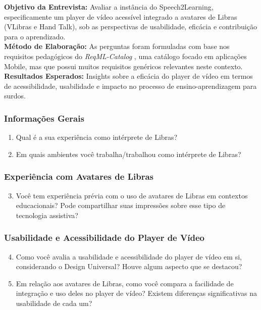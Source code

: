\noindent
\textbf{Objetivo da Entrevista:} Avaliar a instância do Speech2Learning, especificamente um player de vídeo acessível integrado a avatares de Libras (VLibras e Hand Talk), sob as perspectivas de usabilidade, eficácia e contribuição para o aprendizado.\\

\noindent
\textbf{Método de Elaboração:} As perguntas foram formuladas com base nos requisitos pedagógicos do \textit{ReqML-Catalog} \cite{Soad2017_FIE}, uma catálogo focado em aplicações Mobile, mas que possui muitos requisitos genéricos relevantes neste contexto.\\

\noindent
\textbf{Resultados Esperados:} Insights sobre a eficácia do player de vídeo em termos de acessibilidade, usabilidade e impacto no processo de ensino-aprendizagem para surdos.

\subsubsection*{Informações Gerais}
\begin{enumerate}
    \item Qual é a sua experiência como intérprete de Libras?
    \item Em quais ambientes você trabalha/trabalhou como intérprete de Libras?
\end{enumerate}

\subsubsection*{Experiência com Avatares de Libras}
\begin{enumerate}
    \setcounter{enumi}{2}
    \item Você tem experiência prévia com o uso de avatares de Libras em contextos educacionais? Pode compartilhar suas impressões sobre esse tipo de tecnologia assistiva?
\end{enumerate}

\subsubsection*{Usabilidade e Acessibilidade do Player de Vídeo}
\begin{enumerate}
    \setcounter{enumi}{3}
    \item Como você avalia a usabilidade e acessibilidade do player de vídeo em si, considerando o Design Universal? Houve algum aspecto que se destacou?
    \item Em relação aos avatares de Libras, como você compara a facilidade de integração e uso deles no player de vídeo? Existem diferenças significativas na usabilidade de cada um?
\end{enumerate}

